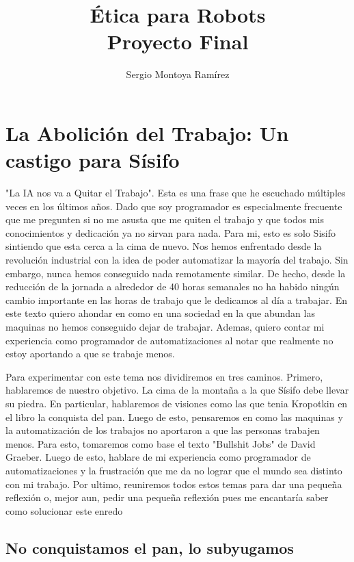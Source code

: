 \documentclass{report}
\title{\Huge{Ética para Robots}\\Proyecto Final}
\author{\huge{Sergio Montoya Ramírez}}
\date{}
\begin{document}
\maketitle
\newpage%
\tableofcontents
\pagebreak

\chapter{La Abolición del Trabajo: Un castigo para Sísifo}

"La IA nos va a Quitar el Trabajo". Esta es una frase que he escuchado múltiples veces en los últimos años. Dado que soy programador es especialmente frecuente que me pregunten si no me asusta que me quiten el trabajo y que todos mis conocimientos y dedicación ya no sirvan para nada. Para mi, esto es solo Sisifo sintiendo que esta cerca a la cima de nuevo. Nos hemos enfrentado desde la revolución industrial con la idea de poder automatizar la mayoría del trabajo. Sin embargo, nunca hemos conseguido nada remotamente similar. De hecho, desde la reducción de la jornada a alrededor de 40 horas semanales no ha habido ningún cambio importante en las horas de trabajo que le dedicamos al día a trabajar. En este texto quiero ahondar en como en una sociedad en la que abundan las maquinas no hemos conseguido dejar de trabajar. Ademas, quiero contar mi experiencia como programador de automatizaciones al notar que realmente no estoy aportando a que se trabaje menos.

  Para experimentar con este tema nos dividiremos en tres caminos. Primero, hablaremos de nuestro objetivo. La cima de la montaña a la que Sísifo debe llevar su piedra. En particular, hablaremos de visiones como las que tenia Kropotkin en el libro la conquista del pan. Luego de esto, pensaremos en como las maquinas y la automatización de los trabajos no aportaron a que las personas trabajen menos. Para esto, tomaremos como base el texto "Bullshit Jobs" de David Graeber. Luego de esto, hablare de mi experiencia como programador de automatizaciones y la frustración que me da no lograr que el mundo sea distinto con mi trabajo. Por ultimo, reuniremos todos estos temas para dar una pequeña reflexión o, mejor aun, pedir una pequeña reflexión pues me encantaría saber como solucionar este enredo

\section{No conquistamos el pan, lo subyugamos}
\end{document}
